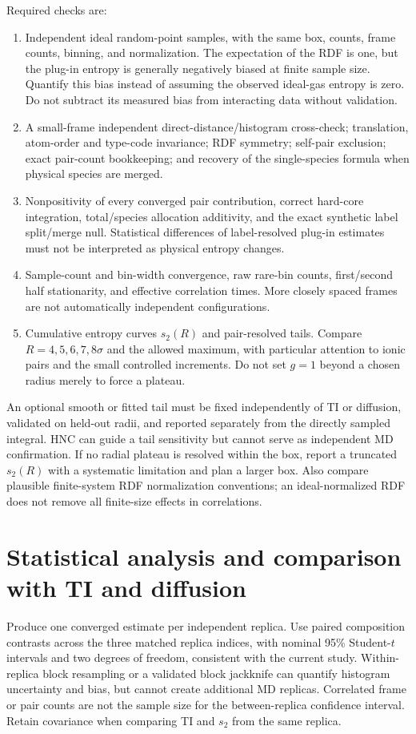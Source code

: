 \documentclass[11pt,a4paper]{article}
\begin{document}
Required checks are:
\begin{enumerate}
\item Independent ideal random-point samples, with the same box, counts,
frame counts, binning, and normalization. The expectation of the RDF is one,
but the plug-in entropy is generally negatively biased at finite sample size.
Quantify this bias instead of assuming the observed ideal-gas entropy is zero.
Do not subtract its measured bias from interacting data without validation.
\item A small-frame independent direct-distance/histogram cross-check;
translation, atom-order and type-code invariance; RDF symmetry;
self-pair exclusion; exact pair-count bookkeeping; and recovery of the
single-species formula when physical species are merged.
\item Nonpositivity of every converged pair contribution, correct hard-core
integration, total/species allocation additivity, and the exact synthetic
label split/merge null. Statistical differences of label-resolved plug-in
estimates must not be interpreted as physical entropy changes.
\item Sample-count and bin-width convergence, raw rare-bin counts, first/second
half stationarity, and effective correlation times. More closely spaced frames
are not automatically independent configurations.
\item Cumulative entropy curves $s_2(R)$ and pair-resolved tails. Compare
$R=4,5,6,7,8\sigma$ and the allowed maximum, with particular attention to ionic
pairs and the small controlled increments. Do not set $g=1$ beyond a chosen
radius merely to force a plateau.
\end{enumerate}

An optional smooth or fitted tail must be fixed independently of TI or diffusion,
validated on held-out radii, and reported separately from the directly sampled
integral. HNC can guide a tail sensitivity but cannot serve as independent
MD confirmation. If no radial plateau is resolved within the box, report a
truncated $s_2(R)$ with a systematic limitation and plan a larger box.
Also compare plausible finite-system RDF normalization conventions; an
ideal-normalized RDF does not remove all finite-size effects in correlations.

\section{Statistical analysis and comparison with TI and diffusion}
Produce one converged estimate per independent replica. Use paired composition
contrasts across the three matched replica indices, with nominal 95\%
Student-$t$ intervals and two degrees of freedom, consistent with the current
study. Within-replica block resampling or a validated block jackknife can
quantify histogram uncertainty and bias, but cannot create additional MD
replicas. Correlated frame or pair counts are not the sample size for the
between-replica confidence interval. Retain covariance when comparing TI and
$s_2$ from the same replica.
\end{document}
